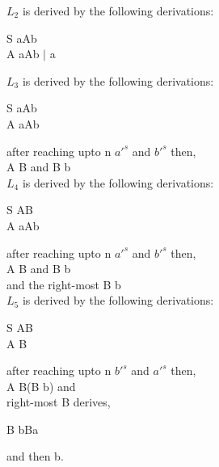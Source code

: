 \documentclass[a4paper,10pt]{article}
\begin{document}
  $L_2$ is derived by the following derivations:\\
  \begin{center}
    S \textrightarrow aAb\\
    A \textrightarrow aAb $\mid$ a\\
  \end{center}
  
  $L_3$ is derived by the following derivations:\\
  \begin{center}
    S \textrightarrow aAb\\
    A \textrightarrow aAb\\
  \end{center}
  after reaching upto n $a'^s$ and $b'^s$ then,\\
  A \textrightarrow B and B \textrightarrow b\\

  $L_4$ is derived by the following derivations:\\
  \begin{center}
    S \textrightarrow AB\\
    A \textrightarrow aAb\\
  \end{center}
  after reaching upto n $a'^s$ and $b'^s$ then,\\
  A \textrightarrow B and B \textrightarrow b\\
  and the right-most B \textrightarrow b\\
  
  $L_5$ is derived by the following derivations:\\
  \begin{center}
    S \textrightarrow AB\\
    A \textrightarrow B\\
  \end{center}
  after reaching upto n $b'^s$ and $a'^s$ then,\\
  A \textrightarrow B(B \textrightarrow b) and \\
  right-most B derives,\\
  \begin{center}
    B \textrightarrow bBa
  \end{center}
  and then b.
\end{document}
